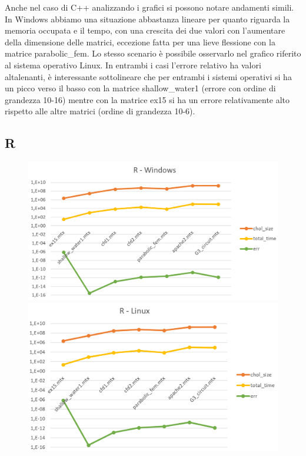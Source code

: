 \documentclass[a4paper,10pt]{article}
\begin{document}
Anche nel caso di C++ analizzando i grafici si possono notare andamenti simili.
In Windows abbiamo una situazione abbastanza lineare per quanto riguarda la memoria occupata e il tempo, con una crescita dei due valori con l’aumentare della dimensione delle matrici, eccezione fatta per una lieve flessione con la matrice parabolic\_fem. 
Lo stesso scenario è possibile osservarlo nel grafico riferito al sistema operativo Linux.
In entrambi i casi l’errore relativo ha valori altalenanti, è interessante sottolineare che per entrambi i sistemi operativi si ha un picco verso il basso con la matrice shallow\_water1 (errore con ordine di grandezza 10-16) mentre con la matrice ex15 si ha un errore relativamente alto rispetto alle altre matrici (ordine di grandezza 10-6).

\subsection{R}


\begin{figure}[H]
\centering
\begin{minipage}{.5\textwidth}
  \centering
  \includegraphics[width=1\linewidth]{img/Rwin.png}
\end{minipage}%
\begin{minipage}{.5\textwidth}
  \centering
  \includegraphics[width=1\linewidth]{img/Rlinux.png}
\end{minipage}
\end{figure}
\end{document}
